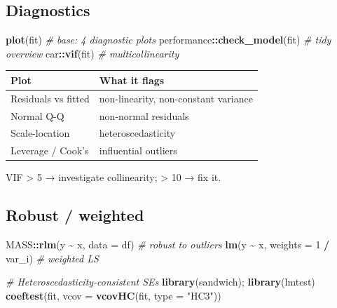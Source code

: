 \documentclass[
]{article}
\newenvironment{Shaded}{\begin{snugshade}}{\end{snugshade}}
\newcommand{\AttributeTok}[1]{\textcolor[rgb]{0.13,0.29,0.53}{#1}}
\newcommand{\CommentTok}[1]{\textcolor[rgb]{0.56,0.35,0.01}{\textit{#1}}}
\newcommand{\DecValTok}[1]{\textcolor[rgb]{0.00,0.00,0.81}{#1}}
\newcommand{\FunctionTok}[1]{\textcolor[rgb]{0.13,0.29,0.53}{\textbf{#1}}}
\newcommand{\NormalTok}[1]{#1}
\newcommand{\SpecialCharTok}[1]{\textcolor[rgb]{0.81,0.36,0.00}{\textbf{#1}}}
\newcommand{\StringTok}[1]{\textcolor[rgb]{0.31,0.60,0.02}{#1}}
\newcounter{none} %
\begin{document}
\subsection{Diagnostics}\label{diagnostics}

\begin{Shaded}
\begin{Highlighting}[]
\FunctionTok{plot}\NormalTok{(fit)                   }\CommentTok{\# base: 4 diagnostic plots}
\NormalTok{performance}\SpecialCharTok{::}\FunctionTok{check\_model}\NormalTok{(fit)   }\CommentTok{\# tidy overview}
\NormalTok{car}\SpecialCharTok{::}\FunctionTok{vif}\NormalTok{(fit)               }\CommentTok{\# multicollinearity}
\end{Highlighting}
\end{Shaded}

{\def\LTcaptype{none} %
\begin{longtable}[]{@{}ll@{}}
\toprule\noalign{}
Plot & What it flags \\
\midrule\noalign{}
\endhead
\bottomrule\noalign{}
\endlastfoot
Residuals vs fitted & non-linearity, non-constant variance \\
Normal Q-Q & non-normal residuals \\
Scale-location & heteroscedasticity \\
Leverage / Cook's & influential outliers \\
\end{longtable}
}

VIF \textgreater{} 5 → investigate collinearity; \textgreater{} 10 → fix
it.

\subsection{Robust / weighted}\label{robust-weighted}

\begin{Shaded}
\begin{Highlighting}[]
\NormalTok{MASS}\SpecialCharTok{::}\FunctionTok{rlm}\NormalTok{(y }\SpecialCharTok{\textasciitilde{}}\NormalTok{ x, }\AttributeTok{data =}\NormalTok{ df)          }\CommentTok{\# robust to outliers}
\FunctionTok{lm}\NormalTok{(y }\SpecialCharTok{\textasciitilde{}}\NormalTok{ x, }\AttributeTok{weights =} \DecValTok{1} \SpecialCharTok{/}\NormalTok{ var\_i)        }\CommentTok{\# weighted LS}

\CommentTok{\# Heteroscedasticity{-}consistent SEs}
\FunctionTok{library}\NormalTok{(sandwich); }\FunctionTok{library}\NormalTok{(lmtest)}
\FunctionTok{coeftest}\NormalTok{(fit, }\AttributeTok{vcov =} \FunctionTok{vcovHC}\NormalTok{(fit, }\AttributeTok{type =} \StringTok{"HC3"}\NormalTok{))}
\end{Highlighting}
\end{Shaded}
\end{document}
